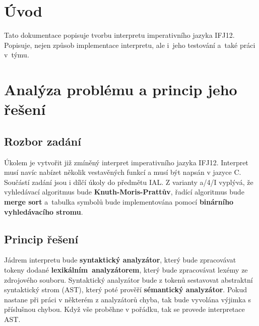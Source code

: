 \documentclass[12pt,a4paper,titlepage,final]{article}
\begin{document}



\pagestyle{plain}
\setcounter{page}{1}
\tableofcontents

\newpage
\pagestyle{plain}
\setcounter{page}{1}

\section{Úvod} \label{uvod}
Tato dokumentace popisuje tvorbu interpretu imperativního jazyka IFJ12. 
Popisuje, nejen způsob implementace interpretu, ale i~jeho testování a~také práci v~týmu.

\section{Analýza problému a princip jeho řešení} \label{analyza}
\subsection{Rozbor zadání}
Úkolem je vytvořit již zmíněný interpret imperativního jazyka IFJ12. Interpret 
musí navíc nabízet několik vestavěných funkcí a musí být napsán v jazyce C. Součástí 
zadání jsou i dílčí úkoly do předmětu IAL. Z varianty a/4/I vyplývá, že vyhledávací 
algoritmus bude \textbf{Knuth-Moris-Prattův}, řadící algoritmus bude \textbf{merge sort} 
a~tabulka symbolů bude implementována pomocí \textbf{binárního vyhledávacího stromu}.
\subsection{Princip řešení}
Jádrem interpretu bude \textbf{syntaktický analyzátor}, který bude zpracovávat tokeny 
dodané \mbox{\textbf{lexikálním analyzátorem}}, který bude zpracovávat lexémy ze zdrojového souboru. 
Syntaktický analyzátor bude z tokenů sestavovat abstraktní syntaktický strom (AST), který poté 
prověří \textbf{sémantický analyzátor}. Pokud nastane při práci v některém z analyzátorů chyba, 
tak bude vyvolána výjimka s příslušnou chybou. Když vše proběhne v pořádku, tak se provede 
interpretace AST. 
\end{document}
